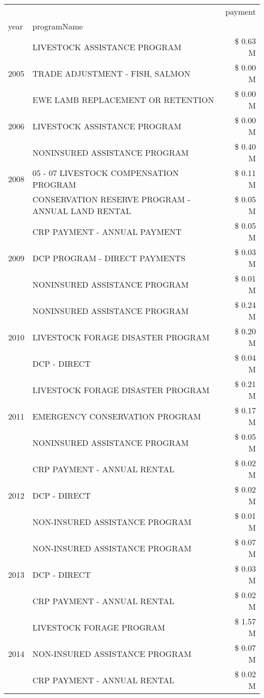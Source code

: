 \begin{tabular}{llr}
\toprule
 &  & payment \\
year & programName &  \\
\midrule
\multirow[t]{3}{*}{2005} & LIVESTOCK ASSISTANCE PROGRAM & \$ 0.63 M \\
 & TRADE ADJUSTMENT - FISH, SALMON & \$ 0.00 M \\
 & EWE LAMB REPLACEMENT OR RETENTION & \$ 0.00 M \\
\cline{1-3}
2006 & LIVESTOCK ASSISTANCE PROGRAM & \$ 0.00 M \\
\cline{1-3}
\multirow[t]{3}{*}{2008} & NONINSURED ASSISTANCE PROGRAM & \$ 0.40 M \\
 & 05 - 07 LIVESTOCK COMPENSATION PROGRAM & \$ 0.11 M \\
 & CONSERVATION RESERVE PROGRAM - ANNUAL LAND RENTAL & \$ 0.05 M \\
\cline{1-3}
\multirow[t]{3}{*}{2009} & CRP PAYMENT - ANNUAL PAYMENT & \$ 0.05 M \\
 & DCP PROGRAM - DIRECT PAYMENTS & \$ 0.03 M \\
 & NONINSURED ASSISTANCE PROGRAM & \$ 0.01 M \\
\cline{1-3}
\multirow[t]{3}{*}{2010} & NONINSURED ASSISTANCE PROGRAM & \$ 0.24 M \\
 & LIVESTOCK FORAGE DISASTER PROGRAM & \$ 0.20 M \\
 & DCP - DIRECT & \$ 0.04 M \\
\cline{1-3}
\multirow[t]{3}{*}{2011} & LIVESTOCK FORAGE DISASTER PROGRAM & \$ 0.21 M \\
 & EMERGENCY CONSERVATION PROGRAM & \$ 0.17 M \\
 & NONINSURED ASSISTANCE PROGRAM & \$ 0.05 M \\
\cline{1-3}
\multirow[t]{3}{*}{2012} & CRP PAYMENT - ANNUAL RENTAL & \$ 0.02 M \\
 & DCP - DIRECT & \$ 0.02 M \\
 & NON-INSURED ASSISTANCE PROGRAM & \$ 0.01 M \\
\cline{1-3}
\multirow[t]{3}{*}{2013} & NON-INSURED ASSISTANCE PROGRAM & \$ 0.07 M \\
 & DCP - DIRECT & \$ 0.03 M \\
 & CRP PAYMENT - ANNUAL RENTAL & \$ 0.02 M \\
\cline{1-3}
\multirow[t]{3}{*}{2014} & LIVESTOCK FORAGE PROGRAM & \$ 1.57 M \\
 & NON-INSURED ASSISTANCE PROGRAM & \$ 0.07 M \\
 & CRP PAYMENT - ANNUAL RENTAL & \$ 0.02 M \\

\end{tabular}

